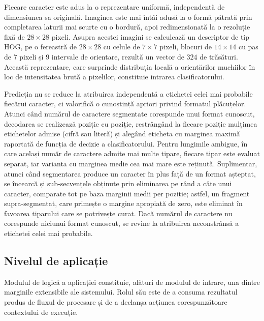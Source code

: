 Fiecare caracter este adus la o reprezentare uniformă, independentă de dimensiunea sa originală. Imaginea este mai întâi adusă la o formă pătrată prin completarea laturii mai scurte cu o bordură, apoi redimensionată la o rezoluție fixă de $28 \times 28$ pixeli. Asupra acestei imagini se calculează un descriptor de tip HOG, pe o fereastră de $28 \times 28$ cu celule de $7 \times 7$ pixeli, blocuri de $14 \times 14$ cu pas de $7$ pixeli și $9$ intervale de orientare, rezultă un vector de $324$ de trăsături. Această reprezentare, care surprinde distribuția locală a orientărilor muchiilor în loc de intensitatea brută a pixelilor, constituie intrarea clasificatorului.

Predicția nu se reduce la atribuirea independentă a etichetei celei mai probabile fiecărui caracter, ci valorifică o cunoștință apriori privind formatul plăcuțelor. Atunci când numărul de caractere segmentate corespunde unui format cunoscut, decodarea se realizează poziție cu poziție, restrângând la fiecare poziție mulțimea etichetelor admise (cifră sau literă) și alegând eticheta cu marginea maximă raportată de funcția de decizie a clasificatorului. Pentru lungimile ambigue, în care același număr de caractere admite mai multe tipare, fiecare tipar este evaluat separat, iar varianta cu marginea medie cea mai mare este reținută. Suplimentar, atunci când segmentarea produce un caracter în plus față de un format așteptat, se încearcă și sub-secvențele obținute prin eliminarea pe rând a câte unui caracter, comparate tot pe baza marginii medii per poziție; astfel, un fragment supra-segmentat, care primește o margine apropiată de zero, este eliminat în favoarea tiparului care se potrivește curat. Dacă numărul de caractere nu corespunde niciunui format cunoscut, se revine la atribuirea neconstrânsă a etichetei celei mai probabile.

\subsection{Nivelul de aplicație}
\indent\par
Modulul de logică a aplicației constituie, alături de modulul de intrare, una dintre marginile extensibile ale sistemului. Rolul său este de a consuma rezultatul produs de fluxul de procesare și de a declanșa acțiunea corespunzătoare contextului de execuție.


